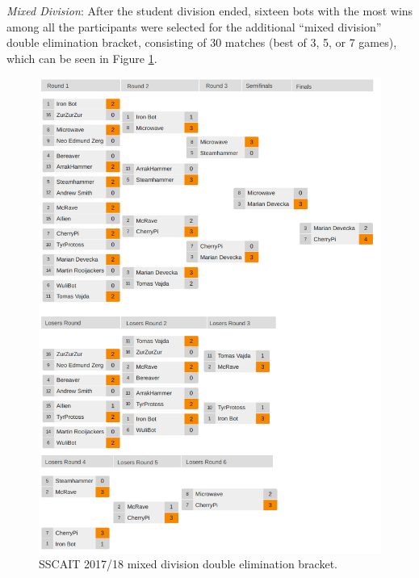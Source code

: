 \emph{Mixed Division}: After the student division ended, sixteen bots with the most wins among all the participants were selected for the additional “mixed division” double elimination bracket, consisting of 30 matches (best of 3, 5, or 7 games), which can be seen in Figure \ref{figSSCAITbracket}. 

\begin{figure}[t] 
  \centering
  \includegraphics[width=1.04\columnwidth]{fig/sscait-bracket.png}
  \caption{SSCAIT 2017/18 mixed division double elimination bracket.}
  \label{figSSCAITbracket}
\end{figure}  

